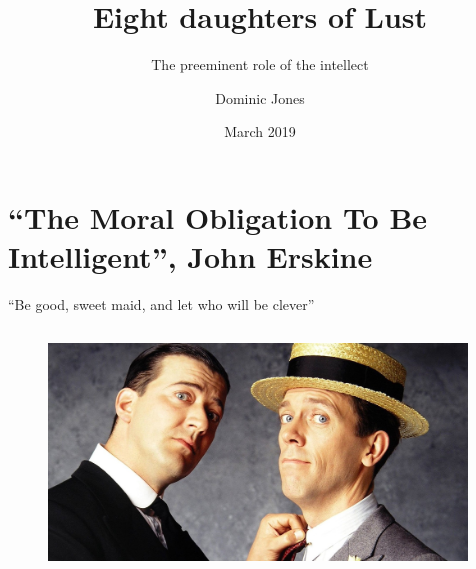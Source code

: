 \documentclass[xcolor=dvipsnames]{beamer}
\title{Eight daughters of Lust}
\subtitle{The preeminent role of the intellect}
\author{Dominic Jones}
\date{\small{March 2019}}
\institute{\small{Netherhall House, London}}
\begin{document}
\begin{frame}[plain]
  \titlepage
\end{frame}


\section{``The Moral Obligation To Be Intelligent'', John Erskine}


\begin{frame}[fragile]{“Be good, sweet maid, and let who will be clever”}
  \begin{columns}[T] %
    \begin{column}{0.9\textwidth}
      \begin{figure}[H]
        \centering
        \includegraphics[width=0.99\textwidth]{wooster}
      \end{figure}
    \end{column}%
  \end{columns}
\end{frame}
\end{document}
